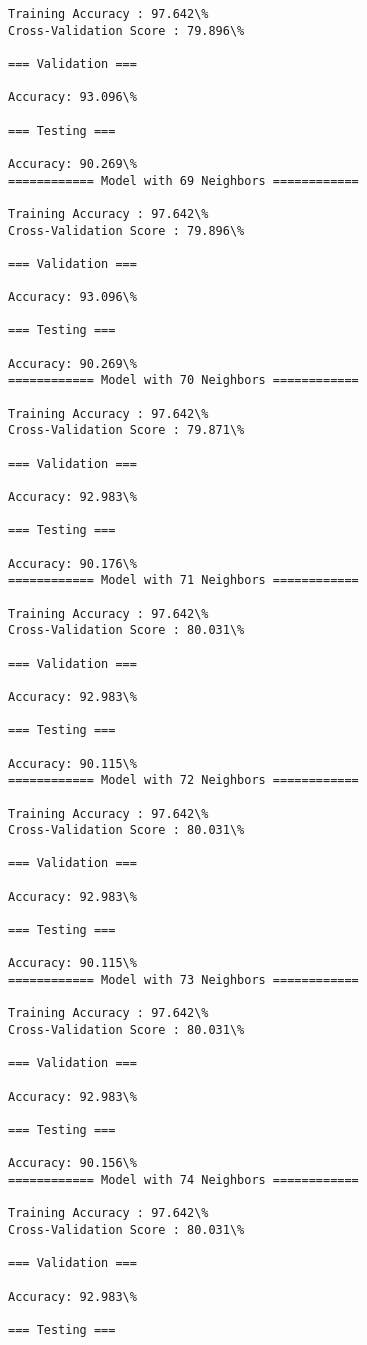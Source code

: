 \documentclass[11pt]{article}
\begin{document}
\begin{Verbatim}[commandchars=\\\{\}]
Training Accuracy : 97.642\%
Cross-Validation Score : 79.896\%

=== Validation ===

Accuracy: 93.096\%

=== Testing ===

Accuracy: 90.269\%
============ Model with 69 Neighbors ============

Training Accuracy : 97.642\%
Cross-Validation Score : 79.896\%

=== Validation ===

Accuracy: 93.096\%

=== Testing ===

Accuracy: 90.269\%
============ Model with 70 Neighbors ============

Training Accuracy : 97.642\%
Cross-Validation Score : 79.871\%

=== Validation ===

Accuracy: 92.983\%

=== Testing ===

Accuracy: 90.176\%
============ Model with 71 Neighbors ============

Training Accuracy : 97.642\%
Cross-Validation Score : 80.031\%

=== Validation ===

Accuracy: 92.983\%

=== Testing ===

Accuracy: 90.115\%
============ Model with 72 Neighbors ============

Training Accuracy : 97.642\%
Cross-Validation Score : 80.031\%

=== Validation ===

Accuracy: 92.983\%

=== Testing ===

Accuracy: 90.115\%
============ Model with 73 Neighbors ============

Training Accuracy : 97.642\%
Cross-Validation Score : 80.031\%

=== Validation ===

Accuracy: 92.983\%

=== Testing ===

Accuracy: 90.156\%
============ Model with 74 Neighbors ============

Training Accuracy : 97.642\%
Cross-Validation Score : 80.031\%

=== Validation ===

Accuracy: 92.983\%

=== Testing ===


\end{Verbatim}
\end{document}
